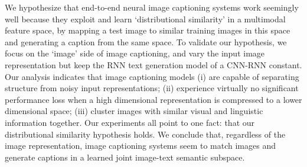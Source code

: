 We hypothesize that end-to-end neural image captioning systems work seemingly well because they exploit and learn `distributional similarity' in a multimodal feature space, by mapping a test image to similar training images in this space and generating a caption from the same space. To validate our hypothesis, we focus on the `image' side of image captioning, and vary the input image representation but keep the RNN text generation model of a CNN-RNN constant. Our analysis indicates that image captioning models (i) are capable of separating structure from noisy input representations; (ii) experience virtually no significant performance loss when a high dimensional representation is compressed to a lower dimensional space; (iii) cluster images with similar visual and linguistic information together. Our experiments all point to one fact: that our distributional similarity hypothesis holds. We conclude that, regardless of the image representation, image captioning systems seem to match images and generate captions in a learned joint image-text semantic subspace.
